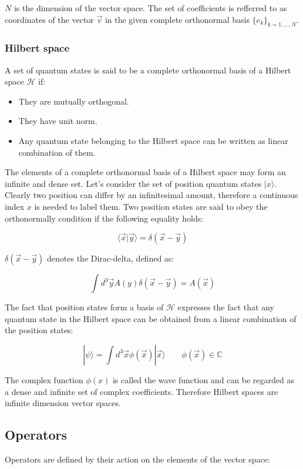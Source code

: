 		$N$ is the dimension of the vector space.
		The set of coefficients is refferred to as coordinates of the vector $\vec{v}$ in the given complete orthonormal basis $\{e_k\}_{k = 1, \dots, N}$.

		\subsubsection{Hilbert space}
		A set of quantum states is said to be a complete orthonormal basis of a Hilbert space $\mathcal{H}$ if:
		\begin{multicols}{2}
			\begin{itemize}
				\item They are mutually orthogonal.
				\item They have unit norm.
				\item Any quantum state belonging to the Hilbert space can be written as linear combination of them.
			\end{itemize}
		\end{multicols}

		The elements of a complete orthonormal basis of a Hilbert space may form an infinite and dense set.
		Let's consider the set of position quantum states $|x\rangle$.
		Clearly two position can differ by an infinitesimal amount, therefore a continuous index $x$ is needed to label them.
		Two position states are said to obey the orthonormally condition if the following equality holds:

		$$\langle \vec{x}|\vec{y}\rangle = \delta(\vec{x}-\vec{y})$$

		$\delta(\vec{x}-\vec{y})$ denotes the Dirac-delta, defined as:

		$$\int d^3\vec{y} A(y)\delta(\vec{x}-\vec{y}) = A(\vec{x})$$

		The fact that position states form a basis of $\mathcal{H}$ expresses the fact that any quantum state in the Hilbert space can be obtained from a linear combination of the position states:

		$$|\psi\rangle = \int d^3 \vec{x}\phi(\vec{x})|\vec{x}\rangle\qquad \phi(\vec{x})\in\mathbb{C}$$

		The complex function $\phi(x)$ is called the wave function and can be regarded as a dense and infinite set of complex coefficients.
		Therefore Hilbert spaces are infinite dimension vector spaces.

	\subsection{Operators}
	Operators are defined by their action on the elements of the vector space:

